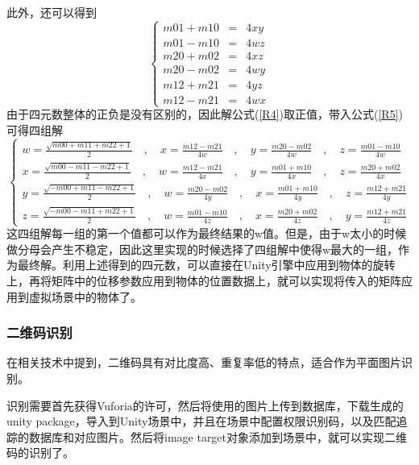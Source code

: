 此外，还可以得到
\begin{equation}\label{R5}
\left\{
\begin{aligned}
m01 + m10 &=& 4xy  \\
m01 - m10 &=& 4wz  \\
m20 + m02 &=& 4xz  \\
m20 - m02 &=& 4wy  \\
m12 + m21 &=& 4yz  \\
m12 - m21 &=& 4wx  
\end{aligned}
\right.
\end{equation}
由于四元数整体的正负是没有区别的，因此解公式(\ref{R4})取正值，带入公式(\ref{R5})可得四组解
\begin{equation}\label{R6}
\left\{
\begin{aligned}
w=\frac{\sqrt{m00 + m11 + m22 + 1}}{2} \quad\mathrm{,}\quad x = \frac{m12 - m21}{4w} \quad\mathrm{,}\quad y = \frac{m20 - m02}{4w} \quad\mathrm{,}\quad z = \frac{m01 - m10}{4w}\\
x=\frac{\sqrt{m00 - m11 - m22 + 1}}{2} \quad\mathrm{,}\quad w = \frac{m12 - m21}{4x} \quad\mathrm{,}\quad y = \frac{m01 + m10}{4x} \quad\mathrm{,}\quad z = \frac{m20 + m02}{4x}\\
y=\frac{\sqrt{-m00 + m11 - m22 + 1}}{2} \quad\mathrm{,}\quad w = \frac{m20 - m02}{4y} \quad\mathrm{,}\quad x = \frac{m01 + m10}{4y} \quad\mathrm{,}\quad z = \frac{m12 + m21}{4y}\\
z=\frac{\sqrt{-m00 - m11 + m22 + 1}}{2} \quad\mathrm{,}\quad w = \frac{m01 - m10}{4z} \quad\mathrm{,}\quad x = \frac{m20 + m02}{4z} \quad\mathrm{,}\quad y = \frac{m12 + m21}{4z}
\end{aligned}
\right.
\end{equation}
这四组解每一组的第一个值都可以作为最终结果的w值。但是，由于w太小的时候做分母会产生不稳定\cite{akenine2018real}，因此这里实现的时候选择了四组解中使得w最大的一组，作为最终解。利用上述得到的四元数，可以直接在Unity引擎中应用到物体的旋转上，再将矩阵中的位移参数应用到物体的位置数据上，就可以实现将传入的矩阵应用到虚拟场景中的物体了。

\subsubsection{二维码识别}
在相关技术中提到，二维码具有对比度高、重复率低的特点，适合作为平面图片识别。

识别需要首先获得Vuforia的许可，然后将使用的图片上传到数据库，下载生成的unity package，导入到Unity场景中，并且在场景中配置权限识别码，以及匹配追踪的数据库和对应图片。然后将image target对象添加到场景中，就可以实现二维码的识别了。

